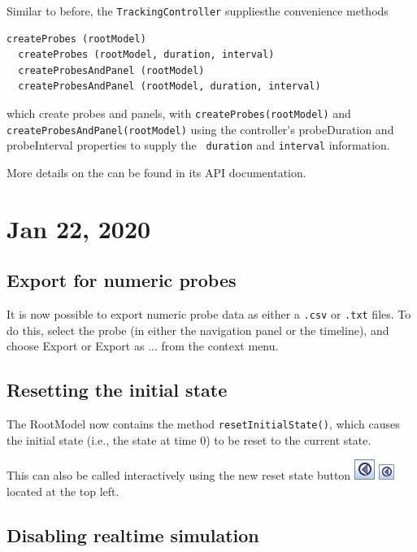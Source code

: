 \documentclass{article}
\begin{document}
Similar to before, the {\tt TrackingController} suppliesthe
convenience methods
%
\begin{lstlisting}[]
  createProbes (rootModel)
  createProbes (rootModel, duration, interval)
  createProbesAndPanel (rootModel)
  createProbesAndPanel (rootModel, duration, interval)
\end{lstlisting}
%
which create probes and panels, with {\tt createProbes(rootModel)} and
{\tt createProbesAndPanel(rootModel)} using the controller's {\sf
probeDuration} and {\sf probeInterval} properties to supply the {\tt
duration} and {\tt interval} information.

More details on the 
can be found in its API documentation.

\section*{Jan 22, 2020}

\subsection*{Export for numeric probes}

It is now possible to export numeric probe data as either a {\tt .csv}
or {\tt .txt} files. To do this, select the probe (in either the
navigation panel or the timeline), and choose {\sf Export} or {\sf
Export as ...} from the context menu.

\subsection*{Resetting the initial state}

The RootModel now contains the method {\tt resetInitialState()}, which
causes the initial state (i.e., the state at time 0) to be reset to
the current state.

This can also be called interactively using the new {\sf reset state}
button 
\iflatexml
\includegraphics[]{../uiguide/images/resetState} 
\else
\includegraphics[width=0.2in]{../uiguide/images/resetState} 
\fi
located at the top left.

\subsection*{Disabling realtime simulation}
\end{document}
